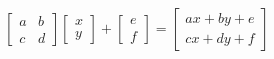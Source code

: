 \documentclass{article}
\begin{document}
\thispagestyle{empty}


$$
\begin{bmatrix}a&b\\c&d\end{bmatrix}\begin{bmatrix}x\\y\end{bmatrix} + \begin{bmatrix}e\\f\end{bmatrix} = \begin{bmatrix}ax+by+e\\cx+dy+f\end{bmatrix}
$$
\end{document}
